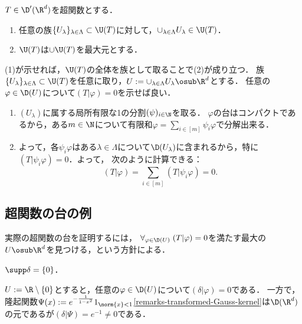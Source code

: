 \documentclass[uplatex,dvipdfmx]{jsreport}
\begin{document}
\begin{proposition}[台の補集合は最大性で特徴付けられる]
    $T\in\D'(\R^d)$を超関数とする．
    \begin{enumerate}
        \item 任意の族$\{U_\lambda\}_{\lambda\in\Lambda}\subset\U(T)$に対して，$\cup_{\lambda\in\Lambda}U_\lambda\in\U(T)$．
        \item $\U(T)$は$\cup\U(T)$を最大元とする．
    \end{enumerate}
\end{proposition}
\begin{Proof}
    (1)が示せれば，$\U(T)$の全体を族として取ることで(2)が成り立つ．
    族$\{U_\lambda\}_{\lambda\in\Lambda}\subset\U(T)$を任意に取り，$U:=\cup_{\lambda\in\Lambda}U_\lambda\osub\R^d$とする．
    任意の$\varphi\in\D(U)$について$(T|\varphi)=0$を示せば良い．
    \begin{enumerate}[{Step}1]
        \item $(U_\lambda)$に属する局所有限な1の分割$(\psi)_{i\in\N}$を取る．
        $\varphi$の台はコンパクトであるから，ある$m\in\N$について有限和$\varphi=\sum_{i\in[m]}\psi_i\varphi$で分解出来る．
        \item よって，各$\psi_i\varphi$はある$\lambda\in\Lambda$について$\D(U_\lambda)$に含まれるから，特に$(T|\psi_i\varphi)=0$．よって，
        次のように計算できる：
        \[(T|\varphi)=\sum_{i\in[m]}(T|\psi_i\varphi)=0.\]
    \end{enumerate}
\end{Proof}

\subsection{超関数の台の例}

\begin{tcolorbox}[colframe=ForestGreen, colback=ForestGreen!10!white,breakable,colbacktitle=ForestGreen!40!white,coltitle=black,fonttitle=\bfseries\sffamily,
title=]
    実際の超関数の台を証明するには，
    $\forall_{\varphi\in\D(U)}\;(T|\varphi)=0$を満たす最大の$U\osub\R^d$を見つける，という方針による．
\end{tcolorbox}

\begin{proposition}[Delta分布の台]
    $\supp\delta=\{0\}$．
\end{proposition}
\begin{Proof}
    $U:=\R\setminus\{0\}$とすると，任意の$\varphi\in\D(U)$について$(\delta|\varphi)=0$である．
    一方で，隆起関数$\Psi(x):=e^{-\frac{1}{1-x^2}}1_{\norm{x}<1}$\ref{remarks-transformed-Gauss-kernel}は$\D(\R^d)$の元であるが$(\delta|\Psi)=e^{-1}\ne0$である．
\end{Proof}
\end{document}
